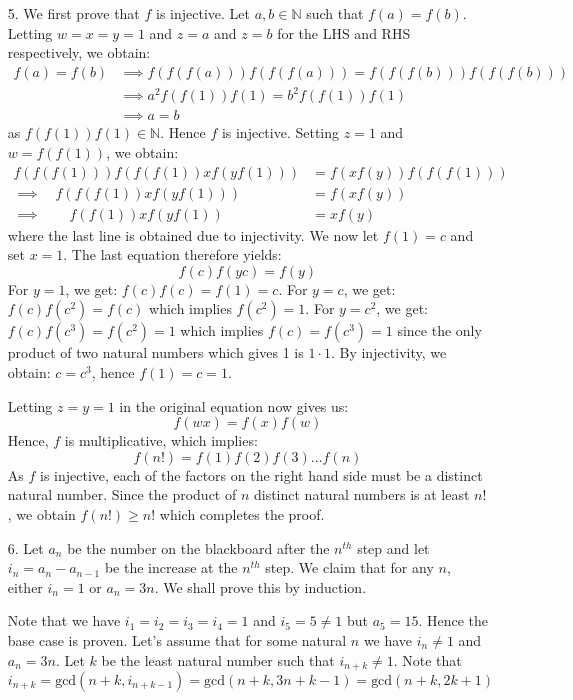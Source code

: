 \documentclass[a4paper, 12pt]{article}
\begin{document}
\begin{enumerate}
    
    \item[5.] We first prove that $f$ is injective. Let $a, b \in \mathbb{N}$ such that $f(a) = f(b)$. Letting $w = x = y = 1$ and $z = a$ and $z = b$ for the LHS and RHS respectively, we obtain:
    \begin{align*}
        f(a) = f(b) &\implies f(f(f(a))) f(f(f(a))) =  f(f(f(b))) f(f(f(b))) \\
        &\implies a^2 f(f(1)) f(1) = b^2 f(f(1)) f(1) \\ &\implies a = b
    \end{align*} 
    as $f(f(1)) f(1) \in \mathbb{N}$. Hence $f$ is injective. Setting $z = 1$ and $w = f(f(1))$, we obtain:
    \begin{align*}
        f(f(f(1))) f(f(f(1)) x f(yf(1))) &= f(xf(y)) f(f(f(1))) \\
        \implies \quad f(f(f(1)) x f(yf(1))) &= f(xf(y)) \\
        \implies \qquad f(f(1)) x f(yf(1)) &= x f(y)
    \end{align*}
    where the last line is obtained due to injectivity. We now let $f(1) = c$ and set $x = 1$. The last equation therefore yields:
    $$ f(c) f(yc) = f(y) $$
    For $y = 1$, we get: $f(c) f(c) = f(1) = c$. For $y = c$, we get: $f(c) f(c^2) = f(c)$ which implies $f(c^2) = 1$. For $y = c^2$, we get: $f(c) f(c^3) = f(c^2) = 1$ which implies $f(c) = f(c^3) = 1$ since the only product of two natural numbers which gives 1 is $1 \cdot 1$. By injectivity, we obtain: $c = c^3$, hence $f(1) = c = 1$.
    
    Letting $z = y = 1$ in the original equation now gives us:
    $$ f(wx) = f(x) f(w) $$
    Hence, $f$ is multiplicative, which implies:
    $$ f(n!) = f(1) f(2) f(3) \dots f(n) $$
    As $f$ is injective, each of the factors on the right hand side must be a distinct natural number. Since the product of $n$ distinct natural numbers is at least $n!$, we obtain $f(n!) \geq n!$ which completes the proof.
    
    
    
    \item[6.] Let $a_n$ be the number on the blackboard after the $n^{th}$ step and let $i_n = a_n - a_{n-1}$ be the increase at the $n^{th}$ step. We claim that for any $n$, either $i_n = 1$ or $a_n = 3n$. We shall prove this by induction.
    
    Note that we have $i_1=i_2=i_3=i_4=1$ and $i_5=5\neq 1$ but $a_5=15$. Hence the base case is proven. Let's assume that for some natural $n$ we have $i_n\neq 1$ and $a_n=3n$. Let $k$ be the least natural number such that $i_{n+k}\neq 1$. Note that
    $$ i_{n+k}=\textrm{gcd}(n+k, i_{n+k-1})=\textrm{gcd}(n+k, 3n+k-1)=\textrm{gcd}(n+k, 2k+1) $$
    

\end{enumerate}
\end{document}
